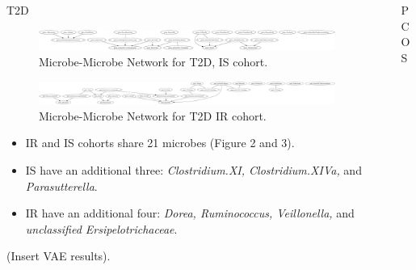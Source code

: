 \documentclass[final]{beamer}
\newlength{\sepwidth}
\newlength{\colwidth}
\newcommand{\separatorcolumn}{\begin{column}{\sepwidth}\end{column}}
\begin{document}
\begin{frame}[t]
\begin{columns}[t]
\begin{column}{\colwidth}
\begin{block}{T2D}
    
    
    \begin{figure}
    	\centering
	\includegraphics[width=\linewidth]{../graphs/t2d/glasso_IS_norm.png}
	\caption{Microbe-Microbe Network for T2D, IS cohort.}
    \end{figure}
    
    \begin{figure}
	\includegraphics[width=\linewidth]{../graphs/t2d/glasso_IR_norm.png}
	\caption{Microbe-Microbe Network for T2D IR cohort.}
    \end{figure}
    
    \begin{itemize}
    	\item IR and IS cohorts share 21 microbes (Figure 2 and 3).
	\item IS have an additional three: \textit{Clostridium.XI, Clostridium.XIVa,} and \textit{Parasutterella}.
	\item IR have an additional four: \textit{Dorea, Ruminococcus, Veillonella,} and \textit{unclassified Ersipelotrichaceae}. 
    \end{itemize}
    
    (Insert VAE results).

  \end{block}

  
\end{column}

\separatorcolumn

\begin{column}{\colwidth}

   \begin{block}{PCOS}



\end{block}
\end{column}
\end{columns}
\end{frame}
\end{document}
